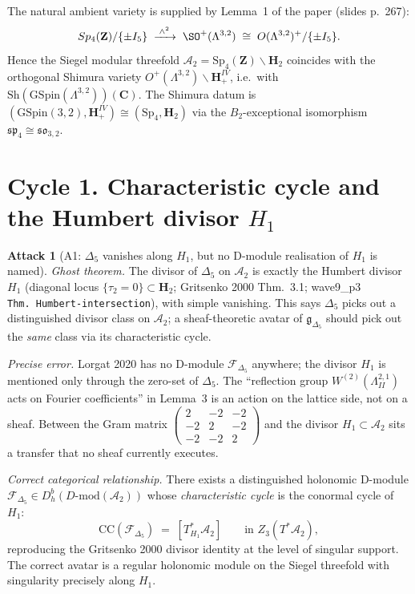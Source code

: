 \documentclass[11pt]{amsart}
\theoremstyle{definition}
\newtheorem{attack}{Attack}
\providecommand{\DMod}{D\text{-}\mathrm{mod}}
\providecommand{\Sh}{\mathrm{Sh}}
\providecommand{\GSpin}{\mathrm{GSpin}}
\providecommand{\Sp}{\mathrm{Sp}}
\providecommand{\fsp}{\mathfrak{sp}}
\providecommand{\fso}{\mathfrak{so}}
\providecommand{\cF}{\mathcal{F}}
\providecommand{\bC}{\mathbf{C}}
\providecommand{\bZ}{\mathbf{Z}}
\providecommand{\bH}{\mathbf{H}}
\providecommand{\Dfive}{\Delta_5}
\providecommand{\gDfive}{\mathfrak{g}_{\Dfive}}
\providecommand{\CharCyc}{\mathrm{CC}}
\begin{document}
The natural ambient variety is supplied by Lemma~1 of the paper
(slides p.~267):
\[
 \Sp_4(\bZ)/\{\pm I_5\}
 \;\xrightarrow{\;\wedge^2\;}\;
 \SO^+(\Lambda^{3,2}) \;\cong\; O(\Lambda^{3,2})^+/\{\pm I_5\}.
\]
Hence the Siegel modular threefold
$\mathcal{A}_2 = \Sp_4(\bZ)\backslash \bH_2$ coincides with the
orthogonal Shimura variety
$O^+(\Lambda^{3,2}) \backslash \bH^{IV}_+$, i.e.\ with
$\Sh(\GSpin(\Lambda^{3,2}))(\bC)$. The Shimura datum is
$(\GSpin(3,2), \bH^{IV}_+) \cong (\Sp_4, \bH_2)$ via the
$B_2$-exceptional isomorphism $\fsp_4 \cong \fso_{3,2}$.

\section{Cycle 1. Characteristic cycle and the Humbert divisor $H_1$}

\begin{attack}[A1: $\Dfive$ vanishes along $H_1$, but no D-module
realisation of $H_1$ is named]\leavevmode

\noindent\emph{Ghost theorem.} The divisor of $\Dfive$ on $\mathcal{A}_2$
is exactly the Humbert divisor $H_1$ (diagonal locus
$\{\tau_2 = 0\} \subset \bH_2$; Gritsenko 2000 Thm.~3.1; wave9\_p3
\texttt{Thm.\ Humbert-intersection}), with simple vanishing. This
says $\Dfive$ picks out a distinguished divisor class on
$\mathcal{A}_2$; a sheaf-theoretic avatar of $\gDfive$ should pick
out the \emph{same} class via its characteristic cycle.

\noindent\emph{Precise error.} Lorgat 2020 has no D-module
$\cF_{\Dfive}$ anywhere; the divisor $H_1$ is mentioned only through
the zero-set of $\Dfive$. The ``reflection group
$W^{(2)}(\Lambda^{2,1}_{II})$ acts on Fourier coefficients'' in
Lemma~3 is an action on the lattice side, not on a sheaf. Between
the Gram matrix $\begin{pmatrix}2 & -2 & -2 \\ -2 & 2 & -2 \\ -2 & -2
& 2\end{pmatrix}$ and the divisor $H_1 \subset \mathcal{A}_2$ sits a
transfer that no sheaf currently executes.

\noindent\emph{Correct categorical relationship.} There exists a
distinguished holonomic D-module $\cF_{\Dfive} \in
D^b_h(\DMod(\mathcal{A}_2))$ whose \emph{characteristic cycle} is the
conormal cycle of $H_1$:
\[
 \CharCyc(\cF_{\Dfive}) \;=\; [T^*_{H_1}\mathcal{A}_2]
 \qquad\text{in } Z_3(T^*\mathcal{A}_2),
\]
reproducing the Gritsenko 2000 divisor identity at the level of
singular support. The correct avatar is a regular holonomic module on
the Siegel threefold with singularity precisely along $H_1$.
\end{attack}
\end{document}
